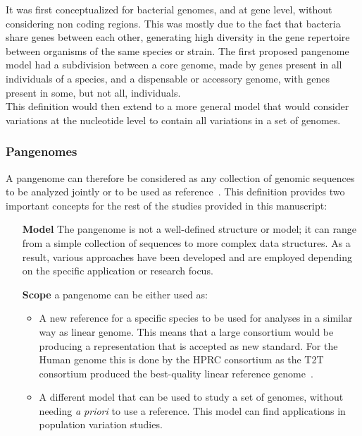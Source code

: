 It was first conceptualized for bacterial genomes, and at gene level, without considering non coding regions. This was mostly due to the fact that bacteria share genes between each other, generating high diversity in the gene repertoire between organisms of the same species or strain.
The first proposed pangenome model had a subdivision between a core genome, made by genes present in all individuals of a species, and a dispensable or accessory genome, with genes present in some, but not all, individuals.\\
This definition would then extend to a more general model that would consider variations at the nucleotide level to contain all variations in a set of genomes.

\subsubsection{Pangenomes}
A pangenome can therefore be considered as any collection of genomic sequences to be analyzed jointly or to be used as reference~\cite{cpmarshall}. This definition provides two important concepts for the rest of the studies provided in this manuscript: 
\begin{itemize}
	\item[\textbf{Model}] The pangenome is not a well-defined structure or model; it can range from a simple collection of sequences to more complex data structures. As a result, various approaches have been developed and are employed depending on the specific application or research focus.
	\item[\textbf{Scope}] a pangenome can be either used as:
	\begin{itemize}
		\item A new reference for a specific species to be used for analyses in a similar way as linear genome. This means that a large consortium would be producing a representation that is accepted as new standard. For the Human genome this is done by the HPRC consortium as the T2T consortium produced the best-quality linear reference genome~\cite{t2t}.
		\item A different model that can be used to study a set of genomes, without needing \emph{a priori} to use a reference. This model can find applications in population variation studies. 
	\end{itemize} 
\end{itemize}
